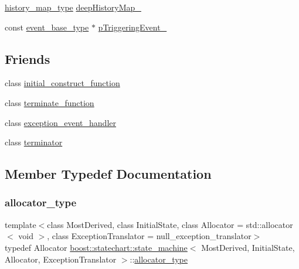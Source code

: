 \begin{DoxyCompactItemize}
\item 
\mbox{\hyperlink{classboost_1_1statechart_1_1state__machine_a9b8fdd7b5af3b0c9143f9d6fb4036ff7}{history\+\_\+map\+\_\+type}} \mbox{\hyperlink{classboost_1_1statechart_1_1state__machine_aeb7e89e544766bf849f78a0b0d2927b6}{deep\+History\+Map\+\_\+}}
\item 
const \mbox{\hyperlink{classboost_1_1statechart_1_1state__machine_adb0e98d6d780a0977209fa7389b20bcd}{event\+\_\+base\+\_\+type}} $\ast$ \mbox{\hyperlink{classboost_1_1statechart_1_1state__machine_a9c2659b211e590134bdfa98105e71db3}{p\+Triggering\+Event\+\_\+}}
\end{DoxyCompactItemize}
\subsection*{Friends}
\begin{DoxyCompactItemize}
\item 
class \mbox{\hyperlink{classboost_1_1statechart_1_1state__machine_afba0b3c3c9e9a6365a84f4ab210e2c74}{initial\+\_\+construct\+\_\+function}}
\item 
class \mbox{\hyperlink{classboost_1_1statechart_1_1state__machine_aa71ed4085290df278ffb602ea5329faf}{terminate\+\_\+function}}
\item 
class \mbox{\hyperlink{classboost_1_1statechart_1_1state__machine_a6cdb9334070fa619595ce2aaa7102994}{exception\+\_\+event\+\_\+handler}}
\item 
class \mbox{\hyperlink{classboost_1_1statechart_1_1state__machine_a8dde3c257059e43db0e48de79ffb385b}{terminator}}
\end{DoxyCompactItemize}


\subsection{Member Typedef Documentation}
\mbox{\label{classboost_1_1statechart_1_1state__machine_a7345d6567cd1a829234bbb7f6c0715da}} 
\subsubsection{\texorpdfstring{allocator\+\_\+type}{allocator\_type}}
{\footnotesize\ttfamily template$<$class Most\+Derived, class Initial\+State, class Allocator = std\+::allocator$<$ void $>$, class Exception\+Translator = null\+\_\+exception\+\_\+translator$>$ \\
typedef Allocator \mbox{\hyperlink{classboost_1_1statechart_1_1state__machine}{boost\+::statechart\+::state\+\_\+machine}}$<$ Most\+Derived, Initial\+State, Allocator, Exception\+Translator $>$\+::\mbox{\hyperlink{classboost_1_1statechart_1_1state__machine_a7345d6567cd1a829234bbb7f6c0715da}{allocator\+\_\+type}}}

